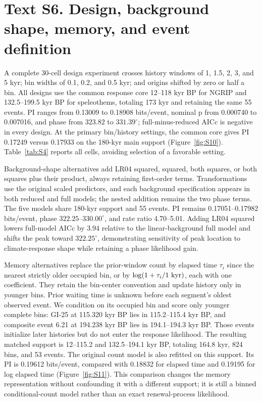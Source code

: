 \documentclass[11pt]{article}
\begin{document}
\section*{Text S6. Design, background shape, memory, and event definition}

A complete 30-cell design experiment crosses history windows of 1, 1.5, 2, 3, and 5 kyr; bin widths of 0.1, 0.2, and 0.5 kyr; and origins shifted by zero or half a bin. All designs use the common response core 12--118 kyr BP for NGRIP and 132.5--199.5 kyr BP for speleothems, totaling 173 kyr and retaining the same 55 events. PI ranges from 0.13009 to 0.18908 bits/event, nominal p from 0.000740 to 0.007016, and phase from $323.82$ to $331.39^\circ$; full-minus-reduced AICc is negative in every design. At the primary bin/history settings, the common core gives PI 0.17249 versus 0.17933 on the 180-kyr main support (Figure~\ref{fig:S10}). Table~\ref{tab:S4} reports all cells, avoiding selection of a favorable setting.

Background-shape alternatives add LR04 squared,  squared, both squares, or both squares plus their product, always retaining first-order terms. Transformations use the original scaled predictors, and each background specification appears in both reduced and full models; the nested addition remains the two phase terms. The five models share 180-kyr support and 55 events. PI remains 0.17051--0.17982 bits/event, phase $322.25$--$330.00^\circ$, and rate ratio 4.70--5.01. Adding LR04 squared lowers full-model AICc by 3.94 relative to the linear-background full model and shifts the peak toward $322.25^\circ$, demonstrating sensitivity of peak location to climate-response shape while retaining a phase likelihood gain.

Memory alternatives replace the prior-window count by elapsed time $\tau_i$ since the nearest strictly older occupied bin, or by $\log(1+\tau_i/1\ {\rm kyr})$, each with one coefficient. They retain the bin-center convention and update history only in younger bins. Prior waiting time is unknown before each segment's oldest observed event. We condition on its occupied bin and score only younger complete bins: GI-25 at 115.320 kyr BP lies in 115.2--115.4 kyr BP, and composite event 6.21 at 194.238 kyr BP lies in 194.1--194.3 kyr BP. Those events initialize later histories but do not enter the response likelihood. The resulting matched support is 12--115.2 and 132.5--194.1 kyr BP, totaling 164.8 kyr, 824 bins, and 53 events. The original count model is also refitted on this support. Its PI is 0.19612 bits/event, compared with 0.18832 for elapsed time and 0.19195 for log elapsed time (Figure~\ref{fig:S11}). This comparison changes the memory representation without confounding it with a different support; it is still a binned conditional-count model rather than an exact renewal-process likelihood.
\end{document}
